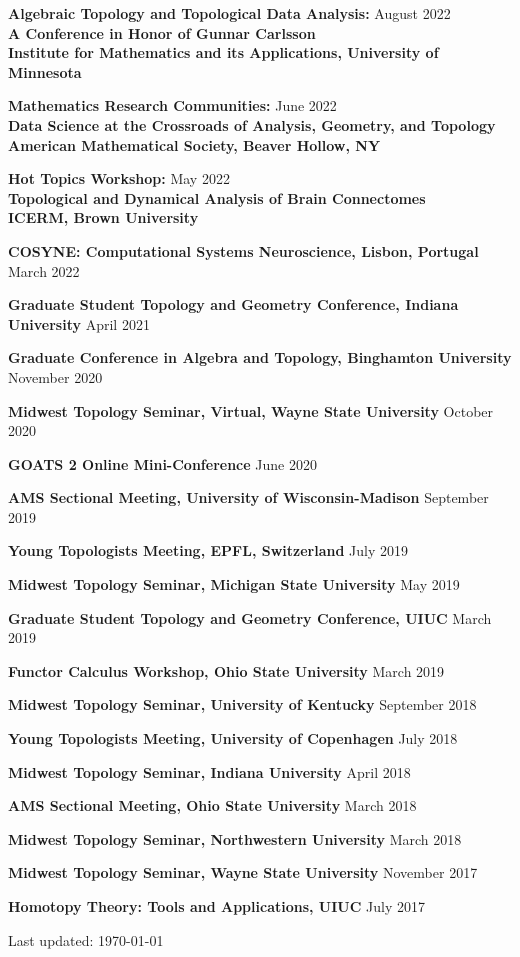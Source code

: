 \documentclass[10pt,letterpaper]{article}
\renewenvironment{itemize}{
  \begin{list}{}{
    \setlength{\leftmargin}{1.5em}
    \setlength{\itemsep}{0.25em}
    \setlength{\parskip}{0pt}
    \setlength{\parsep}{0.25em}
  }
}{
  \end{list}
}
\begin{document}
\begin{itemize}
	\item {\bf Algebraic Topology and Topological Data Analysis:} \hfill August 2022\\
	{\bf A Conference in Honor of Gunnar Carlsson}\\
	{\bf Institute for Mathematics and its Applications, University of Minnesota} 
	\item {\bf Mathematics Research Communities:} \hfill June 2022\\ {\bf Data Science at the Crossroads of Analysis, Geometry, and Topology}\\
	{\bf American Mathematical Society, Beaver Hollow, NY}
	\item {\bf Hot Topics Workshop:} \hfill May 2022\\{\bf Topological and Dynamical Analysis of Brain Connectomes} \\
	{\bf ICERM, Brown University}
	\item {\bf COSYNE: Computational Systems Neuroscience, Lisbon, Portugal} \hfill March 2022
	\item {\bf Graduate Student Topology and Geometry Conference, Indiana University} \hfill April 2021
	\item {\bf Graduate Conference in Algebra and Topology, Binghamton University} \hfill November 2020
	\item {\bf Midwest Topology Seminar, Virtual, Wayne State University} \hfill October 2020
	\item {\bf GOATS 2 Online Mini-Conference} \hfill June 2020
	\item {\bf AMS Sectional Meeting, University of Wisconsin-Madison} \hfill September 2019
	\item {\bf Young Topologists Meeting, EPFL, Switzerland} \hfill July 2019
	\item {\bf Midwest Topology Seminar, Michigan State University} \hfill May 2019
	\item {\bf Graduate Student Topology and Geometry Conference, UIUC} \hfill March 2019
	\item {\bf Functor Calculus Workshop, Ohio State University} \hfill March 2019
	\item {\bf Midwest Topology Seminar, University of Kentucky} \hfill September 2018
	\item {\bf Young Topologists Meeting, University of Copenhagen} \hfill July 2018
	\item {\bf Midwest Topology Seminar, Indiana University} \hfill April 2018
	\item {\bf AMS Sectional Meeting, Ohio State University} \hfill March 2018
	\item {\bf Midwest Topology Seminar, Northwestern University} \hfill March 2018
	\item {\bf Midwest Topology Seminar, Wayne State University} \hfill November 2017
	\item {\bf Homotopy Theory: Tools and Applications, UIUC} \hfill July 2017
	
\end{itemize}







\vfill
\begin{center}
  \begin{small}
    Last updated: \today
  \end{small}
\end{center}
\end{document}
